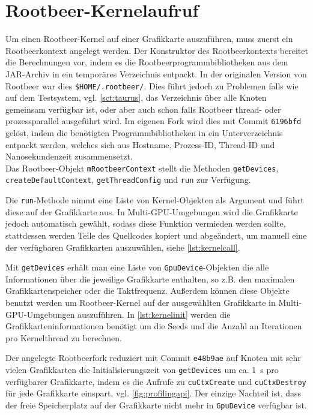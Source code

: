 \section{Rootbeer-Kernelaufruf}

Um einen Rootbeer-Kernel auf einer Grafikkarte auszuführen, muss zuerst ein Rootbeerkontext angelegt werden.
Der Konstruktor des Rootbeerkontexts bereitet die Berechnungen vor, indem es die Rootbeerprogrammbibliotheken aus dem JAR-Archiv in ein temporäres Verzeichnis entpackt.
In der originalen Version von Rootbeer war dies \lstinline!$HOME/.rootbeer/!.
Dies führt jedoch zu Problemen falls wie auf dem Testsystem, vgl. \autoref{sct:taurus}, das Verzeichnis über alle Knoten gemeinsam verfügbar ist, oder aber auch schon falls Rootbeer thread- oder prozessparallel ausgeführt wird.
Im eigenen Fork \cite{ownrootbeerfork} wird dies mit Commit \lstinline!6196bfd! gelöst, indem die benötigten Programmbibliotheken in ein Unterverzeichnis entpackt werden, welches sich aus Hostname, Prozess-ID, Thread-ID und Nanosekundenzeit zusammensetzt.\\

Das Rootbeer-Objekt \lstinline!mRootbeerContext! stellt die Methoden \lstinline!getDevices!, \lstinline!createDefaultContext!, \lstinline!getThreadConfig! und \lstinline!run! zur Verfügung.

Die \lstinline!run!-Methode nimmt eine Liste von Kernel-Objekten als Argument und führt diese auf der Grafikkarte aus. In Multi-GPU-Umgebungen wird die Grafikkarte jedoch automatisch gewählt, sodass diese Funktion vermieden werden sollte, stattdessen werden Teile des Quellcodes kopiert und abgeändert, um manuell eine der verfügbaren Grafikkarten auszuwählen, siehe \autoref{lst:kernelcall}.

Mit \lstinline!getDevices! erhält man eine Liste von \lstinline!GpuDevice!-Objekten die alle Informationen über die jeweilige Grafikkarte enthalten, so z.B. den maximalen Grafikkartenspeicher oder die Taktfrequenz.
Außerdem können diese Objekte benutzt werden um Rootbeer-Kernel auf der ausgewählten Grafikkarte in Multi-GPU-Umgebungen auszuführen. In \autoref{lst:kernelinit} werden die Grafikkarteninformationen benötigt um die Seeds und die Anzahl an Iterationen pro Kernelthread zu berechnen.

Der angelegte Rootbeerfork \cite{ownrootbeerfork} reduziert mit Commit \lstinline!e48b9ae! auf Knoten mit sehr vielen Grafikkarten die Initialisierungszeit von \lstinline!getDevices! um ca. \SI{1}{\second} pro verfügbarer Grafikkarte, indem es die Aufrufe zu \lstinline!cuCtxCreate! und \lstinline!cuCtxDestroy! für jede Grafikkarte einspart, vgl. \autoref{fig:profilingapi}.
Der einzige Nachteil ist, dass der freie Speicherplatz auf der Grafikkarte nicht mehr in \lstinline!GpuDevice! verfügbar ist.

